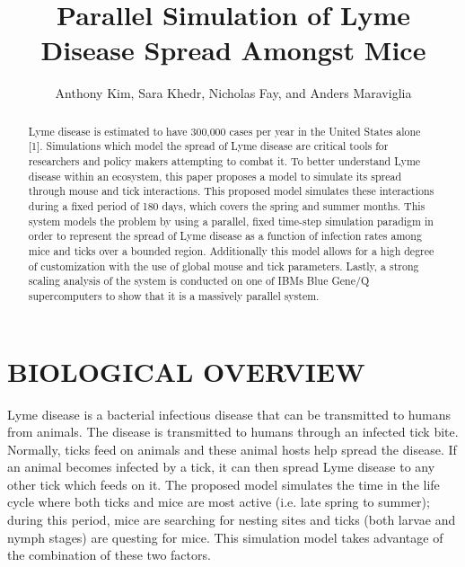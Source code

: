 \documentclass[letterpaper, 10 pt, conference]{ieeeconf}  %
\title{\LARGE \bf
Parallel Simulation of Lyme Disease Spread Amongst Mice
}
\author{Anthony Kim, Sara Khedr, Nicholas Fay, and Anders Maraviglia}
\begin{document}
\maketitle
\thispagestyle{empty}
\pagestyle{empty}


\begin{abstract}

Lyme disease is estimated to have 300,000 cases per year in the United States alone [1].  Simulations which model the spread of Lyme disease are critical tools for researchers and policy makers attempting to combat it.  To better understand Lyme disease within an ecosystem, this paper proposes a model to simulate its spread through mouse and tick interactions. This proposed model simulates these interactions during a fixed period of 180 days, which covers the spring and summer months. This system models the problem by using a parallel, fixed time-step simulation paradigm in order to represent the spread of Lyme disease as a function of infection rates among mice and ticks over a bounded region. Additionally this model allows for a high degree of customization with the use of global mouse and tick parameters.  Lastly, a strong scaling analysis of the system is conducted on one of IBM\textquotesingle s Blue Gene/Q supercomputers to show that it is a massively parallel system.


\end{abstract}


\bigskip

\section{BIOLOGICAL OVERVIEW}

Lyme disease is a bacterial infectious disease that can be transmitted to humans from animals.  The disease is transmitted to humans through an infected tick bite. Normally, ticks feed on animals and these animal hosts help spread the disease. If an animal becomes infected by a tick, it can then spread Lyme disease to any other tick which feeds on it. The proposed model simulates the time in the life cycle where both ticks and mice are most active (i.e. late spring to summer); during this period, mice are searching for nesting sites and ticks (both larvae and nymph stages) are questing for mice.  This simulation model takes advantage of the combination of these two factors.
            
\end{document}
